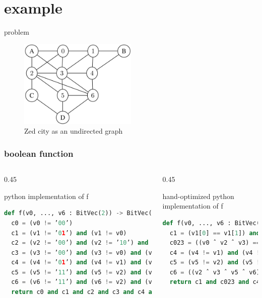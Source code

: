 \section{example}
\begin{frame}{problem \cite{example}}
  \begin{figure}[htbq]
    \centering
    \includegraphics[width=0.5\textwidth]{figure/problem.png}
    \caption{Zed city as an undirected graph} 
    \label{fig-zed}
  \end{figure}
\end{frame}
\begin{frame}[fragile]
  \frametitle{boolean function}
  \begin{columns}
    \begin{column}{0.45\linewidth}
      \begin{block}{python implementation of f }
        \begin{lstlisting}[language=Python]
def f(v0, ..., v6 : BitVec(2)) -> BitVec(1):
  c0 = (v0 != ’00’)
  c1 = (v1 != ’01’) and (v1 != v0)
  c2 = (v2 != ’00’) and (v2 != ’10’) and (v2 != v0)
  c3 = (v3 != ’00’) and (v3 != v0) and (v3 != v1) and (v3 != v2)
  c4 = (v4 != ’01’) and (v4 != v1) and (v4 != v3)
  c5 = (v5 != ’11’) and (v5 != v2) and (v5 != v3)
  c6 = (v6 != ’11’) and (v6 != v2) and (v6 != v3) and (v6 != v4) and (v6 != v5)
  return c0 and c1 and c2 and c3 and c4 and c5 and c6
          \end{lstlisting}
      \end{block}
    \end{column}
    \begin{column}{0.45\linewidth}
      \begin{block}{hand-optimized python implementation of f }
        \begin{lstlisting}[language=Python]
def f(v0, ..., v6 : BitVec(2)) -> BitVec(1):
  c1 = (v1[0] == v1[1]) and (v3 != v1)
  c023 = ((v0 ˆ v2 ˆ v3) == ’00’)
  c4 = (v4 != v1) and (v4 != v3)
  c5 = (v5 != v2) and (v5 != v3)
  c6 = ((v2 ˆ v3 ˆ v5 ˆ v6) == ’00’) and (v6 != v4)
  return c1 and c023 and c4 and c5 and c6
          \end{lstlisting}
      \end{block}
    \end{column}
  \end{columns}
\end{frame}

